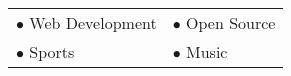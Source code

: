 
{\fontsize{11pt}{1em}\upshape
  \renewcommand{\arraystretch}{2.0}
  \begin{tabular}{ l l }
     $\bullet$ Web Development & $\bullet$ Open Source \\ 
     $\bullet$ Sports & $\bullet$ Music
  \end{tabular}
  
}


